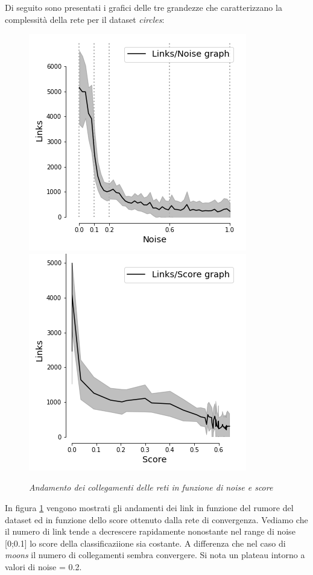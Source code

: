 \documentclass[12pt,a4paper]{report}
\begin{document}
Di seguito sono presentati i grafici delle tre grandezze che caratterizzano la complessità della rete per il dataset \textit{circles}:

\begin{figure}[H]
 \centering
 \includegraphics[scale = 0.5]{images/links_noise_circles}
 \includegraphics[scale = 0.5]{images/Links_Score_circles}
 \caption{\textit{Andamento dei collegamenti delle reti in funzione di noise e score}}
 \label{link-circles}
\end{figure}

In figura \ref{link-circles} vengono mostrati gli andamenti dei link in funzione del rumore del dataset ed in funzione dello score ottenuto dalla rete di convergenza.
Vediamo che il numero di link tende a decrescere rapidamente nonostante nel range di noise [0;0.1] lo score della classificaziione sia costante. A differenza che nel caso di \textit{moons} il numero di collegamenti sembra convergere.
Si nota un plateau intorno a valori di noise = 0.2.
\end{document}
